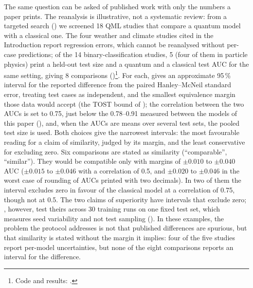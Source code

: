 \documentclass[11pt,a4paper]{article}
\begin{document}
The same question can be asked of published work with only the numbers a paper prints. The reanalysis is illustrative, not a systematic review: from a targeted search () we screened 18 QML studies that compare a quantum model with a classical one. The four weather and climate studies cited in the Introduction report regression errors, which cannot be reanalysed without per-case predictions; of the 14 binary-classification studies, 5 (four of them in particle physics) print a held-out test size and a quantum and a classical test AUC for the same setting, giving 8 comparisons ()\footnote{Code and results: .}. For each,  gives an approximate 95\,\% interval for the reported difference from the paired Hanley--McNeil standard error, treating test cases as independent, and the smallest equivalence margin those data would accept (the TOST bound of ); the correlation between the two AUCs is set to 0.75, just below the 0.78--0.91 measured between the models of this paper (), and, when the AUCs are means over several test sets, the pooled test size is used. Both choices give the narrowest intervals: the most favourable reading for a claim of similarity, judged by its margin, and the least conservative for excluding zero. Six comparisons are stated as similarity (``comparable'', ``similar''). They would be compatible only with margins of $\pm0.010$ to $\pm0.040$ AUC ($\pm0.015$ to $\pm0.046$ with a correlation of 0.5, and $\pm0.020$ to $\pm0.046$ in the worst case of rounding of AUCs printed with two decimals). In two of them the interval excludes zero in favour of the classical model at a correlation of 0.75, though not at 0.5. The two claims of superiority have intervals that exclude zero; \citet{kulkarni2023}, however, test theirs across 30 training runs on one fixed test set, which measures seed variability and not test sampling (). In these examples, the problem the protocol addresses is not that published differences are spurious, but that similarity is stated without the margin it implies: four of the five studies report per-model uncertainties, but none of the eight comparisons reports an interval for the difference.
\end{document}
